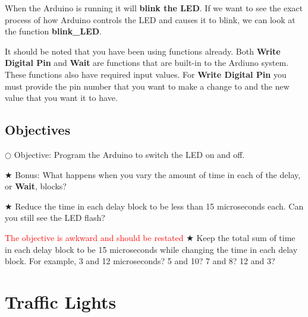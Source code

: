 \documentclass[12pt]{article}
\begin{document}
	When the Arduino is running it will \textbf{blink the LED}. If we want to see the exact process of how Arduino controls the LED and causes it to blink, we can look at the function \textbf{blink\_LED}.
	
	
	It should be noted that you have been using functions already. Both \textbf{Write Digital Pin} and \textbf{Wait} are functions that are built-in to the Ardiuno system. These functions also have required input values. For \textbf{Write Digital Pin} you must provide the pin number that you want to make a change to and the new value that you want it to have. %
	
	
	
	\subsection{Objectives}
	
	\noindent $\bigcirc$ Objective: Program the Arduino to switch the LED on and off.
	
	\noindent $\bigstar$ Bonus: What happens when you vary the amount of time in each of the delay, or \textbf{Wait}, blocks?
	
	\indent $\bigstar$ Reduce the time in each delay block to be less than 15 microseconds each. Can you still see the LED flash?
	
	\textcolor{red}{The objective is awkward and should be restated}
	\indent $\bigstar$ Keep the total sum of time in each delay block to be 15 microseconds while changing the time in each delay block. For example, 3 and 12 microseconds? 5 and 10? 7 and 8? 12 and 3?
	
	
	
	
	
	
	\section{Traffic Lights}
	
\end{document}
